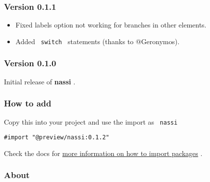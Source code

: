 \subsubsection{Version 0.1.1}\label{version-0.1.1}

\begin{itemize}
\tightlist
\item
  Fixed labels option not working for branches in other elements.
\item
  Added \texttt{\ switch\ } statements (thanks to @Geronymos).
\end{itemize}

\subsubsection{Version 0.1.0}\label{version-0.1.0}

Initial release of \textbf{nassi} .

\subsubsection{How to add}\label{how-to-add}

Copy this into your project and use the import as \texttt{\ nassi\ }

\begin{verbatim}
#import "@preview/nassi:0.1.2"
\end{verbatim}



Check the docs for
\href{https://typst.app/docs/reference/scripting/\#packages}{more
information on how to import packages} .

\subsubsection{About}\label{about}

